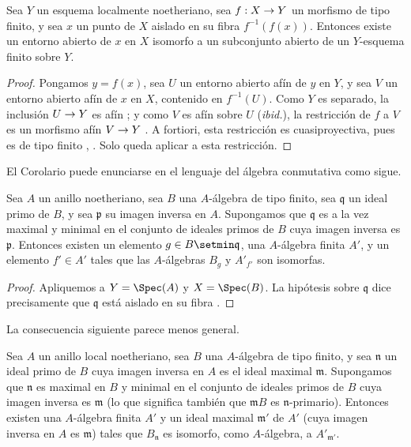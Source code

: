 \documentclass[oneside]{amsart}
\makeatletter
\newcommand{\ega@arrow}[2]{\mathchoice{#1}{#2}{#2}{#2}}
\renewcommand{\to}{\ega@arrow{\longrightarrow}{\rightarrow}}
\newcommand{\oldpage}[2][]{{\marginnote{\normalfont\textbf{#1}~|~#2}}\ignorespaces}
\let\EGAOriginalLabel\label
\renewcommand{\label}[1]{\phantomsection\EGAOriginalLabel{#1}}
\makeatother
\begin{document}
\begin{corollary}[4.4.5]
\label{III.4.4.5}
Sea $Y$ un esquema localmente noetheriano, sea $f:X\to Y$ un
morfismo de tipo finito, y sea $x$ un punto de $X$ aislado en su fibra
$f^{-1}(f(x))$. Entonces existe un entorno abierto de $x$ en $X$
isomorfo a un subconjunto abierto de un $Y$-esquema finito sobre $Y$.
\end{corollary}

\begin{proof}
Pongamos $y=f(x)$, sea $U$ un entorno abierto afín de $y$ en $Y$, y
sea $V$ un entorno abierto afín de $x$ en $X$, contenido en
$f^{-1}(U)$. Como $Y$ es separado, la inclusión $U\to Y$ es afín
; y como $V$ es afín sobre $U$ (\emph{ibid.}), la
restricción de $f$ a $V$ es un morfismo afín $V\to Y$
. A fortiori, esta restricción es
cuasiproyectiva, pues es de tipo finito
, . Solo queda aplicar
 a esta restricción.
\end{proof}

El Corolario  puede enunciarse en el lenguaje del
álgebra conmutativa como sigue.

\begin{corollary}[4.4.6]
\label{III.4.4.6}
Sea $A$ un anillo noetheriano, sea $B$ una $A$-álgebra de tipo
finito, sea $\mathfrak q$ un ideal primo de $B$, y sea $\mathfrak p$
su imagen inversa en $A$. Supongamos que $\mathfrak q$ es a la vez
maximal y minimal en el conjunto de ideales primos de $B$ cuya imagen
inversa es $\mathfrak p$. Entonces existen un elemento
$g\in B\setmin\mathfrak q$, una $A$-álgebra finita $A'$, y un elemento
$f'\in A'$ tales que las $A$-álgebras $B_g$ y $A'_{f'}$ son
isomorfas.
\end{corollary}

\begin{proof}
Apliquemos  a $Y=\Spec(A)$ y $X=\Spec(B)$. La
hipótesis sobre $\mathfrak q$ dice precisamente que $\mathfrak q$
está aislado en su fibra .
\end{proof}

La consecuencia siguiente parece menos general.

\oldpage[III]{137}

\begin{corollary}[4.4.7]
\label{III.4.4.7}
Sea $A$ un anillo local noetheriano, sea $B$ una $A$-álgebra de tipo
finito, y sea $\mathfrak n$ un ideal primo de $B$ cuya imagen inversa
en $A$ es el ideal maximal $\mathfrak m$. Supongamos que $\mathfrak n$
es maximal en $B$ y minimal en el conjunto de ideales primos de $B$
cuya imagen inversa es $\mathfrak m$ (lo que significa también que
$\mathfrak mB$ es $\mathfrak n$-primario). Entonces existen una
$A$-álgebra finita $A'$ y un ideal maximal $\mathfrak m'$ de $A'$
(cuya imagen inversa en $A$ es $\mathfrak m$) tales que $B_{\mathfrak
n}$ es isomorfo, como $A$-álgebra, a $A'_{\mathfrak m'}$.
\end{corollary}
\end{document}
